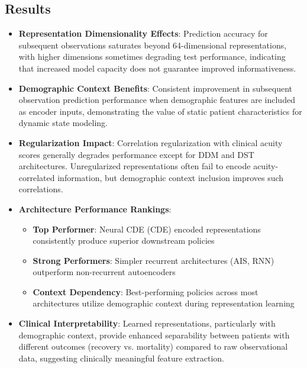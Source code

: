 \subsection*{Results}
\begin{itemize}
    \item \textbf{Representation Dimensionality Effects}: Prediction accuracy for subsequent observations saturates beyond 64-dimensional representations, with higher dimensions sometimes degrading test performance, indicating that increased model capacity does not guarantee improved informativeness.
    \item \textbf{Demographic Context Benefits}: Consistent improvement in subsequent observation prediction performance when demographic features are included as encoder inputs, demonstrating the value of static patient characteristics for dynamic state modeling.
    \item \textbf{Regularization Impact}: Correlation regularization with clinical acuity scores generally degrades performance except for DDM and DST architectures. Unregularized representations often fail to encode acuity-correlated information, but demographic context inclusion improves such correlations.
    \item \textbf{Architecture Performance Rankings}:
    \begin{itemize}
        \item \textbf{Top Performer}: Neural CDE (CDE) encoded representations consistently produce superior downstream policies
        \item \textbf{Strong Performers}: Simpler recurrent architectures (AIS, RNN) outperform non-recurrent autoencoders
        \item \textbf{Context Dependency}: Best-performing policies across most architectures utilize demographic context during representation learning
    \end{itemize}
    \item \textbf{Clinical Interpretability}: Learned representations, particularly with demographic context, provide enhanced separability between patients with different outcomes (recovery vs. mortality) compared to raw observational data, suggesting clinically meaningful feature extraction.
\end{itemize}

